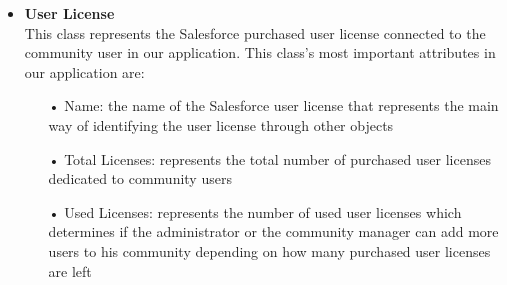 \begin{itemize}
\begin{itemize}
\end{itemize}
\item \textbf{User License}\\
This class represents the Salesforce purchased user license connected to the community user in our application. This class's most important attributes in our application are:
\begin{itemize}
\item[•] Name: the name of the Salesforce user license that represents the main way of identifying the user license through other objects
\item[•] Total Licenses: represents the total number of purchased user licenses dedicated to community users 
\item[•] Used Licenses: represents the number of used user licenses which determines if the administrator or the community manager can add more users to his community depending on how many purchased user licenses are left


\end{itemize}
\end{itemize}
